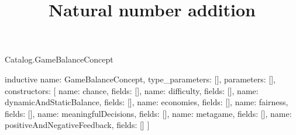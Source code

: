 \begin{lexlean}{Catalog.GameBalanceConcept}
\title{Natural number addition}
\begin{semanticmodule}
inductive{
  name: GameBalanceConcept,
  type_parameters: [],
  parameters: [],
  constructors: [
    {name: chance, fields: []},
    {name: difficulty, fields: []},
    {name: dynamicAndStaticBalance, fields: []},
    {name: economies, fields: []},
    {name: fairness, fields: []},
    {name: meaningfulDecisions, fields: []},
    {name: metagame, fields: []},
    {name: positiveAndNegativeFeedback, fields: []}
  ]
}
\end{semanticmodule}
\end{lexlean}
